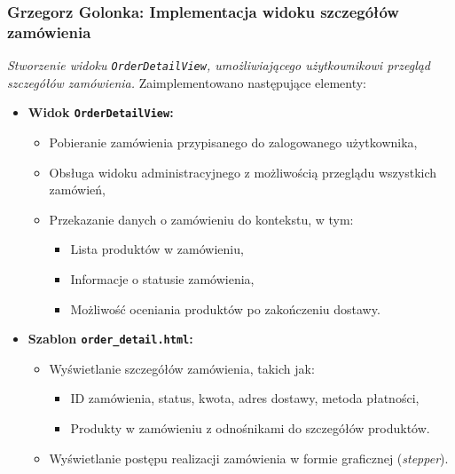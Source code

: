 \documentclass[12pt,a4paper,oneside]{article}
\theoremstyle{definition}
\numberwithin{equation}{section}
\begin{document}
\subsubsection{Grzegorz Golonka: Implementacja widoku szczegółów zamówienia}
\label{section:1.3.28}
\textit{
Stworzenie widoku \texttt{OrderDetailView}, umożliwiającego użytkownikowi przegląd szczegółów zamówienia.
}
Zaimplementowano następujące elementy:
\begin{itemize}
    \item \textbf{Widok \texttt{OrderDetailView}:}
    \begin{itemize}
        \item Pobieranie zamówienia przypisanego do zalogowanego użytkownika,
        \item Obsługa widoku administracyjnego z możliwością przeglądu wszystkich zamówień,
        \item Przekazanie danych o zamówieniu do kontekstu, w tym:
        \begin{itemize}
            \item Lista produktów w zamówieniu,
            \item Informacje o statusie zamówienia,
            \item Możliwość oceniania produktów po zakończeniu dostawy.
        \end{itemize}
    \end{itemize}
    \item \textbf{Szablon \texttt{order\_detail.html}:}
    \begin{itemize}
        \item Wyświetlanie szczegółów zamówienia, takich jak:
        \begin{itemize}
            \item ID zamówienia, status, kwota, adres dostawy, metoda płatności,
            \item Produkty w zamówieniu z odnośnikami do szczegółów produktów.
        \end{itemize}
        \item Wyświetlanie postępu realizacji zamówienia w formie graficznej (\textit{stepper}).
    \end{itemize}
\end{itemize}
%
%
\end{document}
